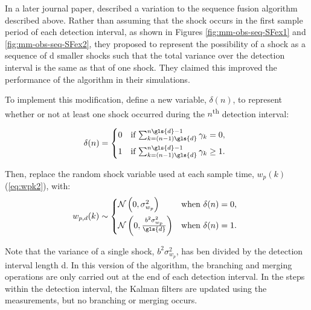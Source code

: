 In a later journal paper, \cite{robertson_method_1998} described a variation to the sequence fusion algorithm described above.  Rather than assuming that the shock occurs in the first sample period of each detection interval, as shown in Figures \ref{fig:mm-obs-seq-SFex1} and \ref{fig:mm-obs-seq-SFex2}, they proposed to represent the possibility of a shock as a sequence of \gls{d} smaller shocks such that the total variance over the detection interval is the same as that of one shock. They claimed this improved the performance of the algorithm in their simulations.

To implement this modification, define a new variable, $\delta(n)$, to represent whether or not at least one shock occurred during the $n$\textsuperscript{th} detection interval:

\begin{equation} \label{eq:deltak}
	\delta(n) = \begin{cases*}
		0 & \text{if} $\sum_{k=(n-1) \gls{d}}^{n \gls{d} - 1}{\gamma_k} = 0$, \\
		1 & \text{if} $\sum_{k=(n-1) \gls{d}}^{n \gls{d} - 1}{\gamma_k} \ge 1$.
	\end{cases*}
\end{equation}

Then, replace the random shock variable used at each sample time, $w_p(k)$ (\ref{eq:wpk2}), with:
\begin{equation} \label{eq:wpdk}
	w_{p,d}(k) \sim 
	\begin{cases*}
		\mathcal{N}\left(0, \sigma_{w_p}^2\right) & \text{when} $\delta(n) = 0$, \\
		\mathcal{N}\left(0, \frac{b^2\sigma_{w_p}^2}{\gls{d}}\right) & \text{when} $\delta(n) = 1$.
	\end{cases*}
\end{equation}

Note that the variance of a single shock, $b^2\sigma_{w_p}^2$, has ben divided by the detection interval length \gls{d}. In this version of the algorithm, the branching and merging operations are only carried out at the end of each detection interval. In the steps within the detection interval, the Kalman filters are updated using the measurements, but no branching or merging occurs.

